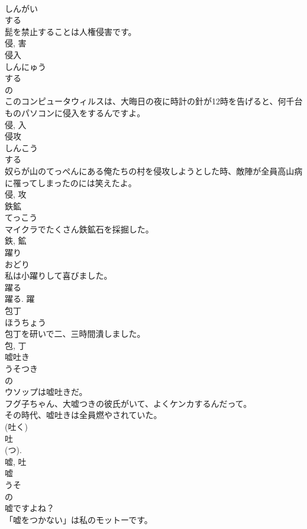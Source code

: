 \documentclass[8pt]{extreport}
\begin{document}
\begin{CJK}{UTF8}{min}
\\	しんがい	
\\	する 
\\	髭を禁止することは人権侵害です。	
\\	侵, 害	
\\	侵入	
\\	しんにゅう	
\\	する 
\\	の 
\\	このコンピュータウィルスは、大晦日の夜に時計の針が12時を告げると、何千台ものパソコンに侵入をするんですよ。	
\\	侵, 入	
\\	侵攻	
\\	しんこう	
\\	する 
\\	奴らが山のてっぺんにある俺たちの村を侵攻しようとした時、敵陣が全員高山病に罹ってしまったのには笑えたよ。	
\\	侵, 攻	
\\	鉄鉱	
\\	てっこう	
\\	マイクラでたくさん鉄鉱石を採掘した。	
\\	鉄, 鉱	
\\	躍り	
\\	おどり	
\\	私は小躍りして喜びました。	
\\	躍る 
\\	躍る.	躍	
\\	包丁	
\\	ほうちょう	
\\	包丁を研いで二、三時間潰しました。	
\\	包, 丁	
\\	嘘吐き	
\\	うそつき	
\\	の 
\\	ウソップは嘘吐きだ。	
\\	フグ子ちゃん、大嘘つきの彼氏がいて、よくケンカするんだって。	
\\	その時代、嘘吐きは全員燃やされていた。	
\\	(吐く) 
\\	吐 
\\	(つ). 
\\	嘘, 吐	
\\	嘘	
\\	うそ	
\\	の 
\\	嘘ですよね？	
\\	「嘘をつかない」は私のモットーです。	

\end{CJK}
\end{document}
